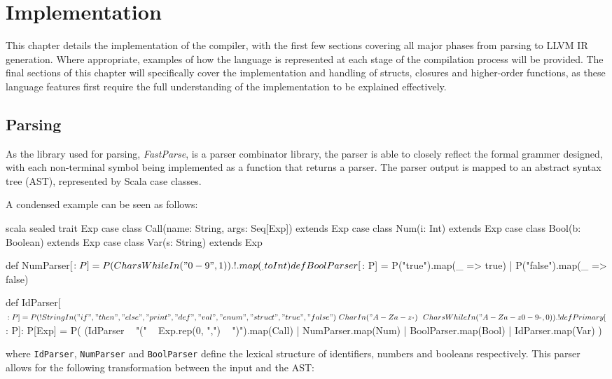 \chapter{Implementation}

This chapter details the implementation of the compiler, with the first few sections covering all
major phases from parsing to LLVM IR generation. Where appropriate, examples of how the language is
represented at each stage of the compilation process will be provided. The final sections of this
chapter will specifically cover the implementation and handling of structs, closures and
higher-order functions, as these language features first require the full understanding of the
implementation to be explained effectively.

\section{Parsing}

As the library used for parsing, \emph{FastParse}, is a parser combinator library, the parser is
able to closely reflect the formal grammer designed, with each non-terminal symbol being implemented
as a function that returns a parser. The parser output is mapped to an abstract syntax tree (AST),
represented by Scala case classes.

A condensed example can be seen as follows:

\begin{code}{scala}
    sealed trait Exp
    case class Call(name: String, args: Seq[Exp]) extends Exp
    case class Num(i: Int) extends Exp
    case class Bool(b: Boolean) extends Exp
    case class Var(s: String) extends Exp

    def NumParser[$: P] =
        P(CharsWhileIn("0-9", 1)).!.map(_.toInt)

    def BoolParser[$: P] =
        P("true").map(_ => true) |
        P("false").map(_ => false)

    def IdParser[$: P] = P(
        !StringIn("if", "then", "else", "print", "def", "val", "enum", "struct", "true", "false")
        ~ CharIn("A-Za-z_") ~~ CharsWhileIn("A-Za-z0-9_", 0)
    ).!

    def Primary[$: P]: P[Exp] = P(
        (IdParser ~ "(" ~ Exp.rep(0, ",") ~ ")").map(Call) |
        NumParser.map(Num) |
        BoolParser.map(Bool) |
        IdParser.map(Var)
    )
\end{code}

\noindent where \texttt{IdParser}, \texttt{NumParser} and \texttt{BoolParser} define the lexical
structure of identifiers, numbers and booleans respectively. This parser allows for the following
transformation between the input and the AST:

